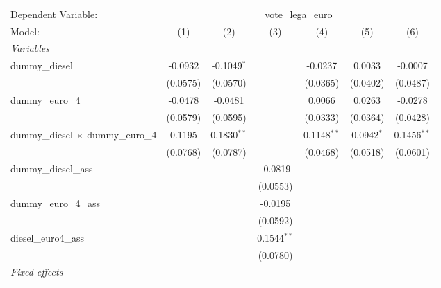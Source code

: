 
\begingroup
\centering
\begin{tabular}{lcccccc}
   \tabularnewline \midrule \midrule
   Dependent Variable: & \multicolumn{6}{c}{vote\_lega\_euro}\\
   Model:                                    & (1)      & (2)           & (3)           & (4)           & (5)          & (6)\\  
   \midrule
   \emph{Variables}\\
   dummy\_diesel                             & -0.0932  & -0.1049$^{*}$ &               & -0.0237       & 0.0033       & -0.0007\\   
                                             & (0.0575) & (0.0570)      &               & (0.0365)      & (0.0402)     & (0.0487)\\   
   dummy\_euro\_4                            & -0.0478  & -0.0481       &               & 0.0066        & 0.0263       & -0.0278\\   
                                             & (0.0579) & (0.0595)      &               & (0.0333)      & (0.0364)     & (0.0428)\\   
   dummy\_diesel $\times$ dummy\_euro\_4     & 0.1195   & 0.1830$^{**}$ &               & 0.1148$^{**}$ & 0.0942$^{*}$ & 0.1456$^{**}$\\   
                                             & (0.0768) & (0.0787)      &               & (0.0468)      & (0.0518)     & (0.0601)\\   
   dummy\_diesel\_ass                        &          &               & -0.0819       &               &              &   \\   
                                             &          &               & (0.0553)      &               &              &   \\   
   dummy\_euro\_4\_ass                       &          &               & -0.0195       &               &              &   \\   
                                             &          &               & (0.0592)      &               &              &   \\   
   diesel\_euro4\_ass                        &          &               & 0.1544$^{**}$ &               &              &   \\   
                                             &          &               & (0.0780)      &               &              &   \\   
   \midrule
   \emph{Fixed-effects}\\

\end{tabular}

